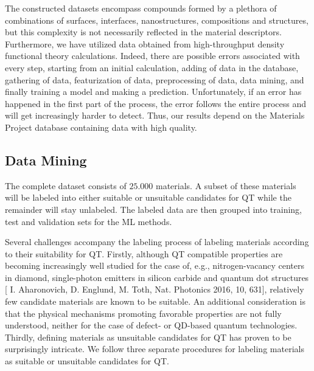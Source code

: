 \documentclass[superscriptaddress,unsortedaddress,
 amsmath,amssymb,
 aps,
]{revtex4-2}
\begin{document}
The constructed datasets encompass compounds formed by a plethora of combinations of surfaces, interfaces, nanostructures, compositions and structures, but this complexity is not necessarily reflected in the material descriptors. 
Furthermore, we have utilized data obtained from high-throughput density functional theory calculations. Indeed, there are possible errors associated with every step, starting from an initial calculation, adding of data in the database, gathering of data, featurization of data, preprocessing of data, data mining, and finally training a model and making a prediction. Unfortunately, if an error has happened in the first part of the process, the error follows the entire process and will get increasingly harder to detect. Thus, our results depend on the Materials Project database containing data with high quality. 


\subsection*{Data Mining}
The complete dataset consists of $25.000$ materials. A subset of these materials will be labeled into either suitable or unsuitable candidates for QT while the remainder will stay unlabeled. The labeled data are then grouped into training, test and validation sets for the ML methods. 

Several challenges accompany the labeling process of labeling materials according to their suitability for QT. 
Firstly, although QT compatible properties are becoming increasingly well studied for the case of, e.g., nitrogen-vacancy centers in diamond, single-photon emitters in silicon carbide and quantum dot structures \cite{Bathen2021}[ I. Aharonovich, D. Englund, M. Toth, Nat. Photonics 2016, 10, 631], relatively few candidate materials are known to be suitable. An additional consideration is that the physical mechanisms promoting favorable properties are not fully understood, neither for the case of defect- or QD-based quantum technologies. Thirdly, defining materials as unsuitable candidates for QT has proven to be surprisingly intricate. 
We follow three separate procedures for labeling materials as suitable or unsuitable candidates for QT. 
\end{document}

